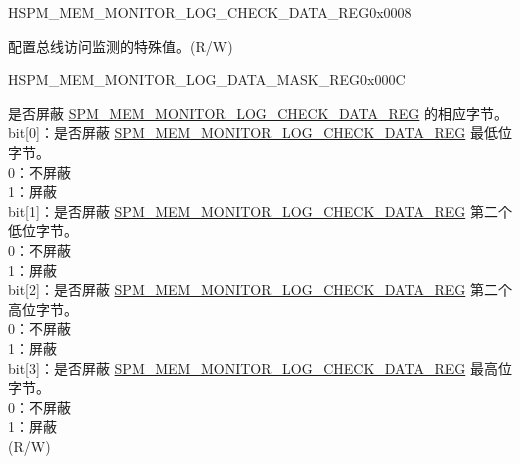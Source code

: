 \begin{register}{H}{SPM\_MEM\_MONITOR\_LOG\_CHECK\_DATA\_REG}{0x0008}\label{regdesc:SPMMEMMONITORLOGCHECKDATAREG}
%
\regnewline%
\begin{regdesc}\begin{reglist}
\label{fielddesc:SPMMEMMONITORLOGCHECKDATA}\item [SPM\_MEM\_MONITOR\_LOG\_CHECK\_DATA] 配置总线访问监测的特殊值。(R/W)
\end{reglist}\end{regdesc}
\end{register}


\begin{register}{H}{SPM\_MEM\_MONITOR\_LOG\_DATA\_MASK\_REG}{0x000C}\label{regdesc:SPMMEMMONITORLOGDATAMASKREG}
%
%
\regnewline%
\begin{regdesc}\begin{reglist}
\label{fielddesc:SPMMEMMONITORLOGDATAMASK}\item[SPM\_MEM\_MONITOR\_LOG\_DATA\_MASK] 是否屏蔽 \hyperref[regdesc:SPMMEMMONITORLOGCHECKDATAREG]{SPM\_MEM\_MONITOR\_LOG\_CHECK\_DATA\_REG} 的相应字节。\\
bit[0]：是否屏蔽 \hyperref[regdesc:SPMMEMMONITORLOGCHECKDATAREG]{SPM\_MEM\_MONITOR\_LOG\_CHECK\_DATA\_REG} 最低位字节。\\
0：不屏蔽\\
1：屏蔽\\
bit[1]：是否屏蔽 \hyperref[regdesc:SPMMEMMONITORLOGCHECKDATAREG]{SPM\_MEM\_MONITOR\_LOG\_CHECK\_DATA\_REG} 第二个低位字节。\\
0：不屏蔽\\
1：屏蔽\\
bit[2]：是否屏蔽 \hyperref[regdesc:SPMMEMMONITORLOGCHECKDATAREG]{SPM\_MEM\_MONITOR\_LOG\_CHECK\_DATA\_REG} 第二个高位字节。\\
0：不屏蔽\\
1：屏蔽\\
bit[3]：是否屏蔽 \hyperref[regdesc:SPMMEMMONITORLOGCHECKDATAREG]{SPM\_MEM\_MONITOR\_LOG\_CHECK\_DATA\_REG} 最高位字节。\\
0：不屏蔽\\
1：屏蔽\\
(R/W)
\end{reglist}\end{regdesc}
\end{register}


